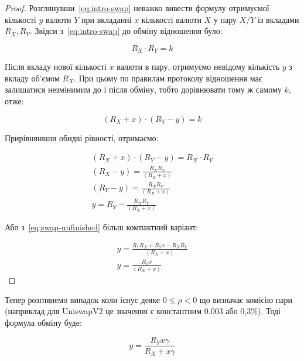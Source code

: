 \documentclass[14pt]{extarticle}
\begin{document}
\begin{proof}
	Розглянувши~\eqref{eq:intro-swap} неважко вивести формулу отримуємої кількості
	\(y\) валюти \(Y\) при вкладанні \(x\) кількості валюти \(X\) у пару \(X/Y\)
	із вкладами \(R_{X}, R_{Y}\). Звідси з~\eqref{eq:intro-swap} до обміну
	відношення було:

	\begin{equation*}
		R_{X} \cdot R_{Y} = k
	\end{equation*}

	Після вкладу нової кількості \(x\) валюти в пару, отримуємо невідому кількість
	\(y\) з вкладу об'ємом \(R_{X}\). При цьому по правилам протоколу
	відношення має залишатися незмінимим до і після обміну, тобто дорівнювати тому
	ж самому \(k\), отже:

	\begin{equation*}
		(R_{X} + x) \cdot (R_{Y} - y) = k
	\end{equation*}

	Прирівнянвши обидві рівності, отримаємо:

	\begin{equation}\label{eq:swap-unfinished}
		\begin{aligned}
			(R_{X} + x) \cdot (R_{Y} - y) = R_{X} \cdot R_{Y} \\
			(R_{X} - y) = \frac{R_{X} R_{Y}}{(R_{X} + x)}         \\
			(R_{Y} - y) = \frac{R_{X} R_{Y}}{(R_{X} + x)}     \\
			y = R_{Y} - \frac{R_{X} R_{Y}}{(R_{X} + x)}
		\end{aligned}
	\end{equation}

	Або з~\eqref{eq:swap-unfinished} більш компактний варіант:

	\begin{equation}
		\begin{aligned}
			y = \frac{R_{Y} R_{X} + R_{Y}x - R_{X}R_{Y}}{(R_{X} + x)} \\
			y = \frac{R_{Y}x}{(R_{X} + x)}
		\end{aligned}
	\end{equation}
\end{proof}

Тепер розглянемо випадок коли існує деяке $0 \leq \rho < 0$ що визначає комісію пари
(наприклад для UniswapV2 це значення є константним $0.003$ або 0,3\%). Тоді
формула обміну буде:

\begin{equation*}
	y = \frac{R_{Y} x \gamma}{R_{X} + x \gamma}
\end{equation*}
\end{document}
